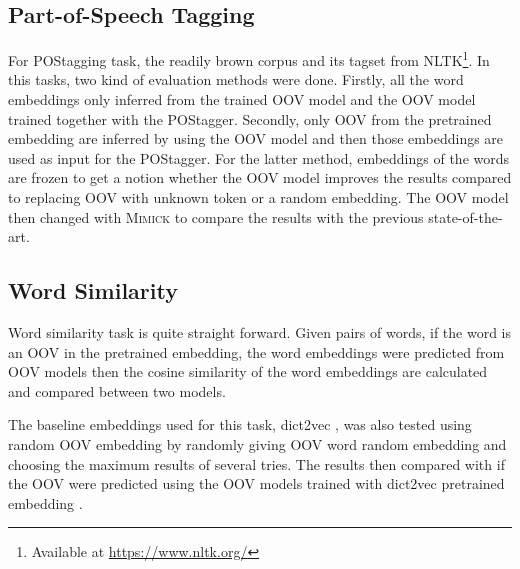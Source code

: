     \subsection{Part-of-Speech Tagging}
        For POStagging task, the readily brown corpus and its tagset
        from NLTK\footnote{Available at \url{https://www.nltk.org/}}.
        In this tasks, two kind of evaluation methods were done.
        Firstly, all the word embeddings only inferred from the
        trained OOV model and the OOV model trained together with the
        POStagger. Secondly, only OOV from the pretrained embedding
        are inferred by using the OOV model and then those embeddings
        are used as input for the POStagger. For the latter method,
        embeddings of the words are frozen to get a notion whether the
        OOV model improves the results compared to replacing OOV with
        unknown token or a random embedding. The OOV model then
        changed with \textsc{Mimick} \citep{mimicking2017Pinter} to
        compare the results with the previous state-of-the-art.

    \subsection{Word Similarity}
        Word similarity task is quite straight forward. Given pairs of
        words, if the word is an OOV in the pretrained embedding, the
        word embeddings were predicted from OOV models then the cosine
        similarity of the word embeddings are calculated and compared
        between two models. 
        
        The baseline embeddings used for this task, dict2vec
        \citep{dict2vect2017tissier}, was also tested using random OOV
        embedding by randomly giving OOV word random embedding and
        choosing the maximum results of several tries. The results
        then compared with if the OOV were predicted using the OOV
        models trained with dict2vec pretrained embedding
        \citep{dict2vect2017tissier}.
